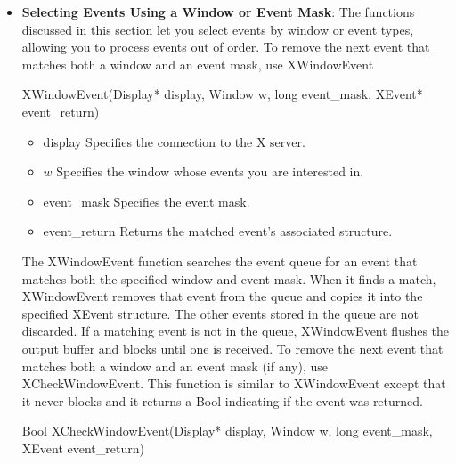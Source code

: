 \documentclass{report}
\begin{document}
\begin{itemize}
            \bigbreak \noindent 
            The XPeekIfEvent function returns only when the specified predicate procedure returns True for an event. After the predicate procedure finds a match, XPeekIfEvent copies the matched event into the client-supplied XEvent structure without removing the event from the queue. XPeekIfEvent flushes the output buffer if it blocks waiting for additional events.
        \item \textbf{Selecting Events Using a Window or Event Mask}: The functions discussed in this section let you select events by window or event types, allowing you to process events out of order.
            \bigbreak \noindent 
            To remove the next event that matches both a window and an event mask, use XWindowEvent
            \bigbreak \noindent 
            \begin{cppcode}
            XWindowEvent(Display* display, Window w, long event_mask, XEvent* event_return)
            \end{cppcode}
            \begin{itemize}
                \item display Specifies the connection to the X server.
                \item $w$ Specifies the window whose events you are interested in.
                \item event\_mask Specifies the event mask.
                \item event\_return Returns the matched event’s associated structure.
            \end{itemize}
            \bigbreak \noindent 
            The XWindowEvent function searches the event queue for an event that matches both the specified window and event mask. When it finds a match, XWindowEvent removes that event from the queue and copies it into the specified XEvent structure. The other events stored in the queue are not discarded. If a matching event is not in the queue, XWindowEvent flushes the output buffer and blocks until one is received.
            \bigbreak \noindent 
            To remove the next event that matches both a window and an event mask (if any), use XCheckWindowEvent. This function is similar to XWindowEvent except that it never blocks and it returns a Bool indicating if the event was returned.
            \bigbreak \noindent 
            \begin{cppcode}
            Bool XCheckWindowEvent(Display* display, Window w, long event_mask, XEvent event_return)
            \end{cppcode}

\end{itemize}
\end{document}
